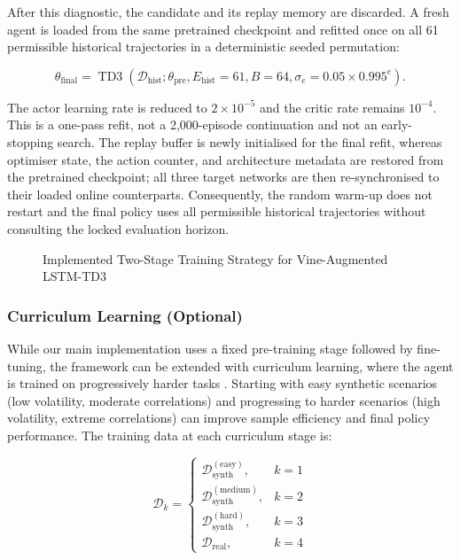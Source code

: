 After this diagnostic, the candidate and its replay memory are discarded. A fresh agent is loaded from the same pretrained checkpoint and refitted once on all 61 permissible historical trajectories in a deterministic seeded permutation:

\begin{equation}
\theta_{\mathrm{final}}=\operatorname{TD3}\!\left(\mathcal{D}_{\mathrm{hist}};\theta_{\mathrm{pre}},E_{\mathrm{hist}}=61,B=64,\sigma_e=0.05\times0.995^e\right).
\label{eq:finetune_objective}
\end{equation}

The actor learning rate is reduced to $2\times10^{-5}$ and the critic rate remains $10^{-4}$. This is a one-pass refit, not a 2,000-episode continuation and not an early-stopping search. The replay buffer is newly initialised for the final refit, whereas optimiser state, the action counter, and architecture metadata are restored from the pretrained checkpoint; all three target networks are then re-synchronised to their loaded online counterparts. Consequently, the random warm-up does not restart and the final policy uses all permissible historical trajectories without consulting the locked evaluation horizon.

\begin{figure}[H]
\centering

\caption{Implemented Two-Stage Training Strategy for Vine-Augmented LSTM-TD3}
\label{fig:two_stage_training}
\end{figure}



\subsubsection{Curriculum Learning (Optional)}
\label{subsubsec:3_curriculum_learning}

While our main implementation uses a fixed pre-training stage followed by fine-tuning, the framework can be extended with curriculum learning, where the agent is trained on progressively harder tasks \cite{bengio_curriculum_2009}. Starting with easy synthetic scenarios (low volatility, moderate correlations) and progressing to harder scenarios (high volatility, extreme correlations) can improve sample efficiency and final policy performance. The training data at each curriculum stage is:

\begin{equation}
\mathcal{D}_k = \begin{cases}
\mathcal{D}_{\text{synth}}^{(\text{easy})}, & k = 1 \\
\mathcal{D}_{\text{synth}}^{(\text{medium})}, & k = 2 \\
\mathcal{D}_{\text{synth}}^{(\text{hard})}, & k = 3 \\
\mathcal{D}_{\text{real}}, & k = 4
\end{cases}
\label{eq:curriculum}
\end{equation}

